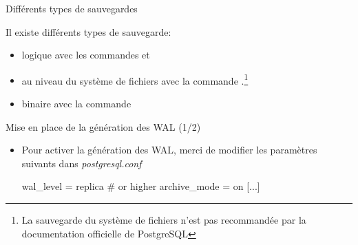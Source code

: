 \begin{frame}[fragile]{Différents types de sauvegardes}

Il existe différents types de sauvegarde:

\begin{itemize}

   \item logique avec les commandes  et 
   \item au niveau du système de fichiers avec la commande .\footnote{La sauvegarde du système de fichiers n'est pas recommandée par la documentation officielle de PostgreSQL}
   \item binaire avec la commande 

\end{itemize}

\begin{toile}
\end{toile}

\end{frame}


\begin{frame}[fragile]{Mise en place de la génération des WAL (1/2)}

\begin{itemize}

   \item Pour activer la génération des WAL, merci de modifier les paramètres suivants dans \textit{postgresql.conf}

\begin{intercom}
wal\_level = replica # or higher
archive\_mode = on
[...]
\end{intercom}

\end{itemize}

\begin{toile}
\end{toile}

\end{frame}


